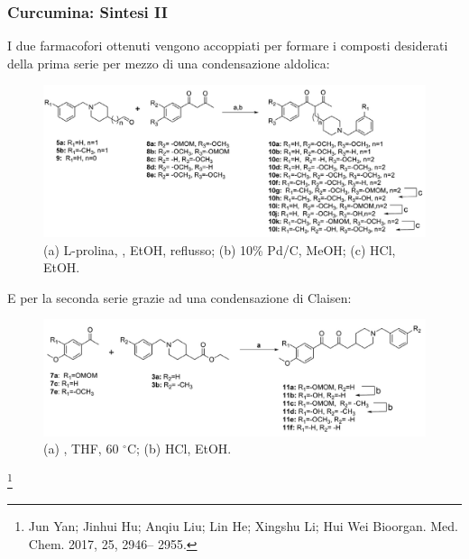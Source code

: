 \documentclass[9pt]{beamer}
\newcommand\blfootnote[1]{%
	\begingroup
	\renewcommand\thefootnote{}\footnote{#1}%
	\addtocounter{footnote}{-1}%
	\endgroup
}
\begin{document}
\begin{frame}
	\frametitle{Curcumina: Sintesi II}
	I due farmacofori ottenuti vengono accoppiati per formare i composti desiderati della prima serie per mezzo di una condensazione aldolica:
	\begin{figure}
		\includegraphics[width=.7\textwidth]{immagini/condserie1_curcdone.png}
		{\caption*{\tiny{(a) L-prolina,  , EtOH, reflusso; (b) 10\% Pd/C, MeOH; (c) HCl, EtOH.}}}
	\end{figure}
	E per la seconda serie grazie ad una condensazione di Claisen:
	\begin{figure}
		\includegraphics[width=.7\textwidth]{immagini/condserie2_curcdone.png}
		{\caption*{\tiny{(a)  , THF, 60 $^\circ$C; (b) HCl, EtOH.}}}
	\end{figure}
	\blfootnote{Jun Yan; Jinhui Hu; Anqiu Liu; Lin He; Xingshu Li; Hui Wei Bioorgan. Med. Chem. 2017, 25, 2946–
		2955.}
\end{frame}
\end{document}
